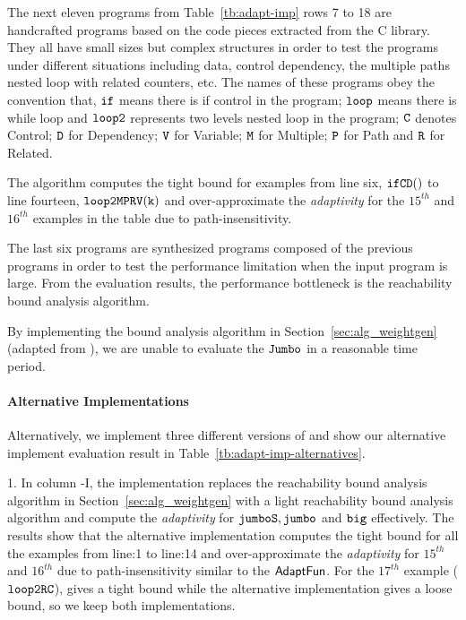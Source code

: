 The next eleven programs from Table~\ref{tb:adapt-imp} rows 7 to 18 are handcrafted programs based on the code pieces extracted from the C library. They all have small sizes but complex structures in order to test the programs under different situations including
data, control dependency,
the multiple paths nested loop with related counters, etc.
The names of these programs obey the convention that,
$\mathtt{if}$ means there is if control in the program;
$\mathtt{loop}$ means there is while loop and $\mathtt{loop2}$ represents two levels nested loop in the program;
$\mathtt{C}$ denotes Control;
$\mathtt{D}$ for Dependency; $\mathtt{V}$ for Variable;
$\mathtt{M}$ for Multiple; $\mathtt{P}$ for Path and $\mathtt{R}$ for Related.


The algorithm computes the tight bound for examples from line six, $\mathtt{ifCD()}$ to line fourteen, $\mathtt{loop2MPRV(k)}$
and over-approximate the \emph{adaptivity} for the $15^{th}$ and $16^{th}$ examples in the table due to path-insensitivity.

The last six programs are synthesized programs composed of the previous programs in order to test the performance limitation when the input program is large. 
From the evaluation results, the performance bottleneck is the reachability bound analysis algorithm.


By implementing the bound analysis algorithm in Section~\ref{sec:alg_weightgen} (adapted from \cite{SinnZV17}), we are unable to evaluate the $\mathtt{Jumbo}$ in a reasonable time period.

\paragraph{Alternative Implementations}

Alternatively, we implement three different versions of {\THESYSTEM} and show our alternative implement evaluation result in Table~\ref{tb:adapt-imp-alternatives}.
 
1. In column {\THESYSTEM}-I, the implementation replaces the reachability bound analysis algorithm in Section~\ref{sec:alg_weightgen} with a light reachability bound analysis algorithm and compute the \emph{adaptivity} for
$\mathtt{jumboS}, \mathtt{jumbo}$ and $\mathtt{big}$ effectively.
The results show that the alternative implementation computes the tight bound for all the examples from line:1 to line:14
and over-approximate the \emph{adaptivity} for $15^{th}$ and $16^{th}$ due to path-insensitivity similar to the
$\textsf{AdaptFun}$.
For the $17^{th}$ example ($\mathtt{loop2RC}$), {\THESYSTEM} gives a tight bound while the alternative implementation gives a loose bound, so we keep both implementations.

